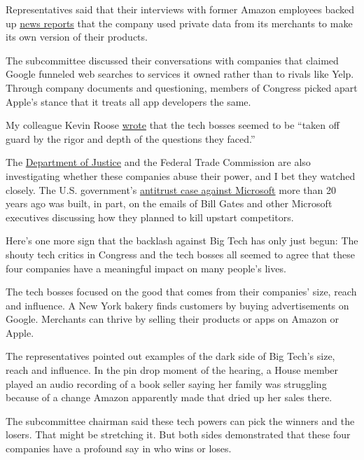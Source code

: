 Representatives said that their interviews with former Amazon employees
backed up
\href{https://www.wsj.com/articles/amazon-scooped-up-data-from-its-own-sellers-to-launch-competing-products-11587650015}{news
reports} that the company used private data from its merchants to make
its own version of their products.

The subcommittee discussed their conversations with companies that
claimed Google funneled web searches to services it owned rather than to
rivals like Yelp. Through company documents and questioning, members of
Congress picked apart Apple's stance that it treats all app developers
the same.

My colleague Kevin Roose
\href{https://www.nytimes3xbfgragh.onion/2020/07/30/technology/big-tech-ceos.html}{wrote}
that the tech bosses seemed to be ``taken off guard by the rigor and
depth of the questions they faced.''

The
\href{https://www.nytimes3xbfgragh.onion/2020/06/25/technology/barr-google-investigation.html}{Department
of Justice} and the Federal Trade Commission are also investigating
whether these companies abuse their power, and I bet they watched
closely. The U.S. government's
\href{https://www.nytimes3xbfgragh.onion/live/2020/07/29/technology/tech-ceos-hearing-testimony/todays-hearing-has-echoes-of-bill-gates-22-years-ago}{antitrust
case against Microsoft} more than 20 years ago was built, in part, on
the emails of Bill Gates and other Microsoft executives discussing how
they planned to kill upstart competitors.

Here's one more sign that the backlash against Big Tech has only just
begun: The shouty tech critics in Congress and the tech bosses all
seemed to agree that these four companies have a meaningful impact on
many people's lives.

The tech bosses focused on the good that comes from their companies'
size, reach and influence. A New York bakery finds customers by buying
advertisements on Google. Merchants can thrive by selling their products
or apps on Amazon or Apple.

The representatives pointed out examples of the dark side of Big Tech's
size, reach and influence. In the pin drop moment of the hearing, a
House member played an audio recording of a book seller saying her
family was struggling because of a change Amazon apparently made that
dried up her sales there.

The subcommittee chairman said these tech powers can pick the winners
and the losers. That might be stretching it. But both sides demonstrated
that these four companies have a profound say in who wins or loses.

